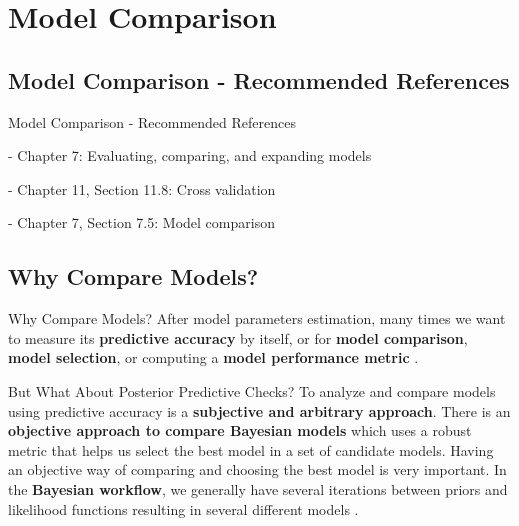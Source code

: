 
\section{Model Comparison}

\subsection{Model Comparison - Recommended References}
\begin{frame}{Model Comparison - Recommended References}
	\begin{vfilleditems}
		\item \textcite{gelman2013bayesian} - Chapter 7: Evaluating, comparing, and expanding models
		\item \textcite{gelman2020regression} - Chapter 11, Section 11.8: Cross validation
		\item \textcite{mcelreath2020statistical} - Chapter 7, Section 7.5: Model comparison
		\item \textcite{vehtariPracticalBayesianModel2015}
		\item \textcite{spiegelhalter2002bayesian}
		\item \textcite{van2005dic}
		\item \textcite{watanabe2010asymptotic}
		\item \textcite{gelfand1996model}
		\item \textcite{watanabe2010asymptotic}
		\item \textcite{geisser1979predictive}
	\end{vfilleditems}
\end{frame}

\subsection{Why Compare Models?}
\begin{frame}{Why Compare Models?}
	After model parameters estimation,
	many times we want to measure its \textbf{predictive accuracy} by itself,
	or for \textbf{model comparison}, \textbf{model selection}, or computing a \textbf{model performance metric}
	\parencite{geisser1979predictive}.
\end{frame}

\begin{frame}{But What About Posterior Predictive Checks?}
	To analyze and compare models using predictive accuracy is a
	\textbf{subjective and arbitrary approach}.
	\vfill
	There is an \textbf{objective approach to compare Bayesian models}
	which uses a robust metric that helps us
	select the best model in a set of candidate models.
	\vfill
	Having an objective way of comparing and choosing the best model is very important.
	In the \textbf{Bayesian workflow},
	we generally have several iterations between priors and likelihood functions
	resulting in several different models \parencite{gelmanBayesianWorkflow2020}.
\end{frame}

